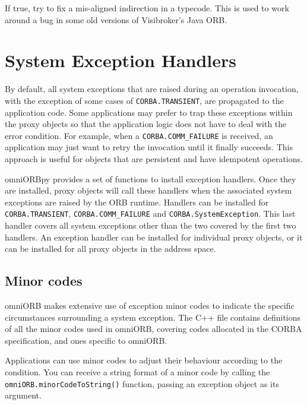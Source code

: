 \documentclass[draft,11pt,twoside,a4paper]{book}
\newcommand{\code}[1]{\texttt{#1}}
\newcommand{\op}[1]{\texttt{#1()}}
\newcommand{\file}{\begingroup \urlstyle{tt}\Url}
\newcommand{\dsc}{\discretionary{}{}{}}
\begin{document}
If true, try to fix a mis-aligned indirection in a typecode. This is
used to work around a bug in some old versions of Visibroker's Java
ORB.


\vspace{2\baselineskip}


\section{System Exception Handlers}
\label{sec:exHandlers}

By default, all system exceptions that are raised during an operation
invocation, with the exception of some cases of
\code{CORBA.TRANSIENT}, are propagated to the application code. Some
applications may prefer to trap these exceptions within the proxy
objects so that the application logic does not have to deal with the
error condition. For example, when a \code{CORBA.COMM\_FAILURE} is
received, an application may just want to retry the invocation until
it finally succeeds. This approach is useful for objects that are
persistent and have idempotent operations.

omniORBpy provides a set of functions to install exception handlers.
Once they are installed, proxy objects will call these handlers when
the associated system exceptions are raised by the ORB runtime.
Handlers can be installed for \code{CORBA.\dsc{}TRANSIENT},
\code{CORBA.COMM\_FAILURE} and \code{CORBA.SystemException}.  This
last handler covers all system exceptions other than the two covered
by the first two handlers. An exception handler can be installed for
individual proxy objects, or it can be installed for all proxy objects
in the address space.


\subsection{Minor codes}

omniORB makes extensive use of exception minor codes to indicate the
specific circumstances surrounding a system exception.  The C++ file
\file{include/omniORB4/minorCode.h} contains definitions of all the
minor codes used in omniORB, covering codes allocated in the CORBA
specification, and ones specific to omniORB.

Applications can use minor codes to adjust their behaviour according
to the condition. You can receive a string format of a minor code by
calling the \op{omniORB.\dsc{}minorCodeToString} function, passing an
exception object as its argument.
\end{document}
